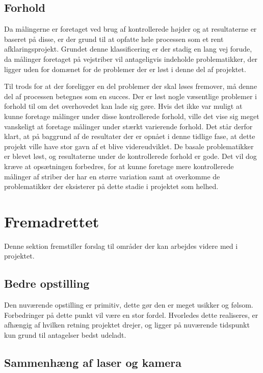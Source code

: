 \subsection{Forhold}
Da målingerne er foretaget ved brug af kontrollerede højder og at resultaterne er baseret på disse, er der grund til at opfatte hele processen som et rent afklaringsprojekt.
Grundet denne klassificering er der stadig en lang vej forude, da målinger foretaget på vejstriber vil antageligvis indeholde problematikker, der ligger uden for domænet for de problemer der er løst i denne del af projektet. 

Til trods for at der foreligger en del problemer der skal løses fremover, må denne del af processen betegnes som en succes.
Der er løst nogle væsentlige problemer i forhold til om det overhovedet kan lade sig gøre. Hvis det ikke var muligt at kunne foretage målinger under disse kontrollerede forhold, ville det vise sig meget vanskeligt at foretage målinger under stærkt varierende forhold.
Det står derfor klart, at på baggrund af de resultater der er opnået i denne tidlige fase, at dette projekt ville have stor gavn af et blive videreudviklet. De basale problematikker er blevet løst, og resultaterne under de kontrollerede forhold er gode. Det vil dog kræve at opsætningen forbedres, for at kunne foretage mere kontrollerede målinger af striber der har en større variation samt at overkomme de problematikker der eksisterer på dette stadie i projektet som helhed.

\newpage

\section{Fremadrettet}

Denne sektion fremstiller forslag til områder der kan arbejdes videre med i projektet.

\subsection{Bedre opstilling}

Den nuværende opstilling er primitiv, dette gør den er meget usikker og følsom. Forbedringer på dette punkt vil være en stor fordel. Hvorledes dette realiseres, er afhængig af hvilken retning projektet drejer, og ligger på nuværende tidspunkt kun grund til antagelser bedst udeladt.

\subsection{Sammenhæng af laser og kamera}

